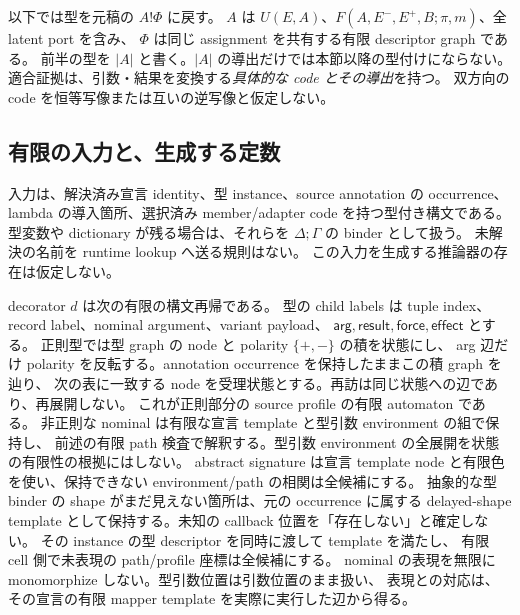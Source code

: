 \documentclass[11pt,a4paper]{article}
\begin{document}
以下では型を元稿の \(A!\Phi\) に戻す。
\(A\) は \(U(E,A)\)、\(F(A,E^-,E^+,B;\pi,m)\)、全 latent port を含み、
\(\Phi\) は同じ assignment を共有する有限 descriptor graph である。
前半の型を \(|A|\) と書く。\(|A|\) の導出だけでは本節以降の型付けにならない。
適合証拠は、引数・結果を変換する\emph{具体的な code とその導出}を持つ。
双方向の code を恒等写像または互いの逆写像と仮定しない。

\subsection{有限の入力と、生成する定数}

入力は、解決済み宣言 identity、型 instance、source annotation の occurrence、
lambda の導入箇所、選択済み member/adapter code を持つ型付き構文である。
型変数や dictionary が残る場合は、それらを \(\Delta;\Gamma\) の binder として扱う。
未解決の名前を runtime lookup へ送る規則はない。
この入力を生成する推論器の存在は仮定しない。

decorator \(d\) は次の有限の構文再帰である。
型の child labels は tuple index、record label、nominal argument、variant payload、
\(\mathsf{arg},\mathsf{result},\mathsf{force},\mathsf{effect}\) とする。
正則型では型 graph の node と polarity \(\{+,-\}\) の積を状態にし、
arg 辺だけ polarity を反転する。annotation occurrence を保持したままこの積 graph を辿り、
次の表に一致する node を受理状態とする。再訪は同じ状態への辺であり、再展開しない。
これが正則部分の source profile の有限 automaton である。
非正則な nominal は有限な宣言 template と型引数 environment の組で保持し、
前述の有限 path 検査で解釈する。型引数 environment の全展開を状態の有限性の根拠にはしない。
abstract signature は宣言 template node と有限色を使い、保持できない environment/path の相関は全候補にする。
抽象的な型 binder の shape がまだ見えない箇所は、元の occurrence に属する
delayed-shape template として保持する。未知の callback 位置を「存在しない」と確定しない。
その instance の型 descriptor を同時に渡して template を満たし、
有限 cell 側で未表現の path/profile 座標は全候補にする。
nominal の表現を無限に monomorphize しない。型引数位置は引数位置のまま扱い、
表現との対応は、その宣言の有限 mapper template を実際に実行した辺から得る。
\end{document}
